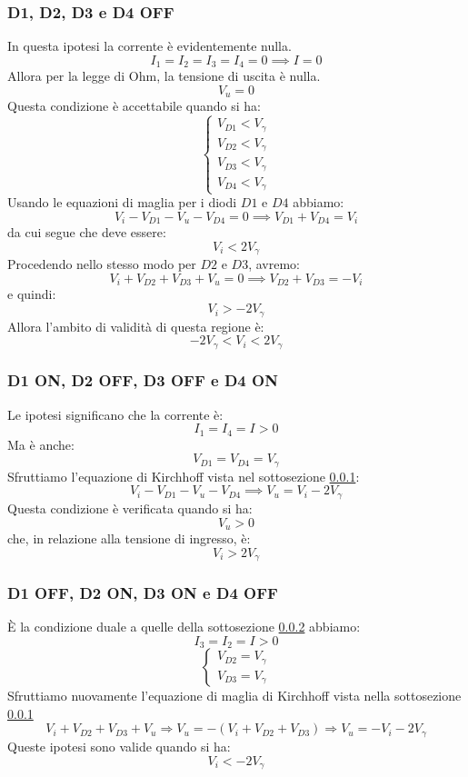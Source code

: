 \documentclass[../main.tex]{subfiles}
\begin{document}
	\subsubsection{D1, D2, D3 e D4 OFF}
	\label{subsub:raddr-sopp-sem-off-off-off-off}
	In questa ipotesi la corrente è evidentemente nulla.
	$$I_1 = I_2 = I_3 = I_4 = 0 \implies I = 0$$
	Allora per la legge di Ohm, la tensione di uscita è nulla.
	$$V_u = 0$$
	Questa condizione è accettabile quando si ha:
	$$\begin{cases} V_{D1} < V_\gamma \\ V_{D2} < V_\gamma \\ V_{D3} < V_\gamma \\ V_{D4} < V_\gamma \end{cases}$$
	Usando le equazioni di maglia per i diodi $D1$ e $D4$ abbiamo:
	$$V_i - V_{D1} - V_u - V_{D4} = 0 \implies V_{D1} + V_{D4} = V_i$$
	da cui segue che deve essere:
	$$V_i < 2V_\gamma$$
	Procedendo nello stesso modo per $D2$ e $D3$, avremo:
	$$V_i + V_{D2} + V_{D3} + V_u = 0 \implies V_{D2} + V_{D3} = -V_i$$
	e quindi:
	$$V_i > -2V_\gamma$$
	Allora l’ambito di validità di questa regione è:
	$$-2V_\gamma < V_i < 2V_\gamma$$
	\subsubsection{D1 ON, D2 OFF, D3 OFF e D4 ON}
	\label{subsub:raddr-sopp-sem-on-off-off-on}
	Le ipotesi significano che la corrente è:
	$$I_1 = I_4 = I > 0$$
	Ma è anche:
	$$V_{D1} = V_{D4} = V_\gamma$$
	Sfruttiamo l’equazione di Kirchhoff vista nel sottosezione \ref{subsub:raddr-sopp-sem-off-off-off-off}:
	$$V_i - V_{D1} - V_u - V_{D4} \implies V_u = V_i - 2V_\gamma$$
	Questa condizione è verificata quando si ha:
	$$V_u > 0$$
	che, in relazione alla tensione di ingresso, è:
	$$V_i > 2V_\gamma$$
	\subsubsection{D1 OFF, D2 ON, D3 ON e D4 OFF}
	\label{subsub:raddr-sopp-sem-off-on-on-off}
	È la condizione duale a quelle della sottosezione \ref{subsub:raddr-sopp-sem-on-off-off-on} abbiamo:
	$$I_3 = I_2 = I > 0$$
	$$\begin{cases} V_{D2} = V_\gamma \\ V_{D3} = V_\gamma \end{cases}$$
	Sfruttiamo nuovamente l’equazione di maglia di Kirchhoff vista nella sottosezione \ref{subsub:raddr-sopp-sem-off-off-off-off}
	$$V_i + V_{D2} + V_{D3} + V_u \Longrightarrow V_u = -(V_i + V_{D2} + V_{D3}) \Longrightarrow V_u = -V_i - 2V_\gamma$$
	Queste ipotesi sono valide quando si ha:
	$$V_i < -2V_\gamma$$
\end{document}
